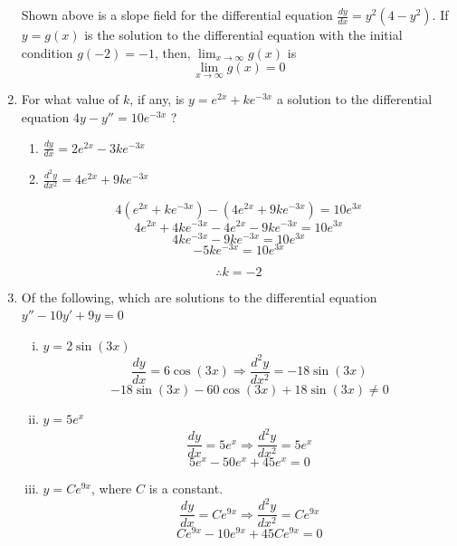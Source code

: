\documentclass[12pt]{article}
\begin{document}
\begin{enumerate}
\begin{center}
    \end{center}
    Shown above is a slope field for the differential equation $\frac{dy}{dx}=y^2(4-y^2)$. If $y = g(x)$ is the solution to the differential equation with the initial condition $g(-2)=-1$, then, $\lim_{x\to\infty} g(x)$ is
    $$\boxed{\lim_{x\to\infty} g(x)=0}$$
    \item For what value of $k$, if any, is $y=e^{2x}+ke^{-3x}$ a solution to the differential equation $4y-y''=10e^{-3x}$ ?
    \begin{enumerate}
        \item $\frac{dy}{dx}=2e^{2x}-3ke^{-3x}$
        \item $\frac{d^2y}{dx^2}=4e^{2x}+9ke^{-3x}$
    \end{enumerate}
    $$4(e^{2x}+ke^{-3x})-(4e^{2x}+9ke^{-3x})=10e^{3x}$$
    $$4e^{2x}+4ke^{-3x}-4e^{2x}-9ke^{-3x}=10e^{3x}$$
    $$4ke^{-3x}-9ke^{-3x}=10e^{3x}$$
    $$-5ke^{-3x}=10e^{3x}$$
    
   $$ \boxed{\therefore k=-2}$$
   \item Of the following, which are solutions to the differential equation $y''-10y'+9y=0$
   \begin{enumerate} [i.]
       \item $y=2\sin(3x)$
       $$\frac{dy}{dx}=6\cos(3x) \Longrightarrow \frac{d^2y}{dx^2}=-18\sin(3x)$$
       $$-18\sin(3x)-60\cos(3x)+18\sin(3x)\neq 0$$
       \item $y=5e^x$
        $$\frac{dy}{dx}=5e^x \Longrightarrow \frac{d^2y}{dx^2}=5e^x$$
        $$5e^x-50e^x+45e^x=0$$
       \item $y=Ce^{9x}$, where $C$ is a constant.
        $$\frac{dy}{dx}=Ce^{9x} \Longrightarrow \frac{d^2y}{dx^2}=Ce^{9x}$$
         $$Ce^{9x}-10e^{9x}+45Ce^{9x}=0$$
   \end{enumerate}


\end{enumerate}
\end{document}
